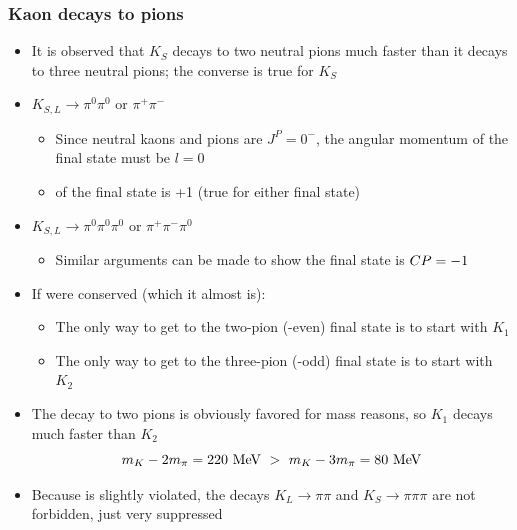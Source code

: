   \subsubsection{Kaon decays to pions}
  \begin{itemize}
    \item It is observed that $K_S$ decays to two neutral pions much faster than it decays to three neutral pions; the converse is true for $K_S$
    \item $K_{S,L}\rightarrow \pi^0\pi^0$ or $\pi^+\pi^-$
    \begin{itemize}
      \item Since neutral kaons and pions are $J^P = 0^-$, the angular momentum of the final state must be $l=0$
      \item \thus \CP of the final state is +1 (true for either final state)
    \end{itemize}
    \item $K_{S,L} \rightarrow \pi^0\pi^0\pi^0$ or $\pi^+\pi^-\pi^0$
    \begin{itemize}
      \item Similar arguments can be made to show the final state is $CP = -1$
    \end{itemize}
    \item If \CP were conserved (which it almost is):
    \begin{itemize}
      \item The only way to get to the two-pion (\CP-even) final state is to start with $K_1$
      \item The only way to get to the three-pion (\CP-odd) final state is to start with $K_2$
    \end{itemize}
    \item The decay to two pions is obviously favored for mass reasons, so $K_1$ decays much faster than $K_2$
    \begin{equation}
      m_K - 2m_\pi = 220~\text{MeV} ~ > ~ m_K - 3m_\pi = 80~\text{MeV}
    \end{equation}
    \item Because \CP is slightly violated, the decays $K_L\rightarrow \pi\pi$ and $K_S \rightarrow \pi\pi\pi$ are not forbidden, just very suppressed
  \end{itemize}

